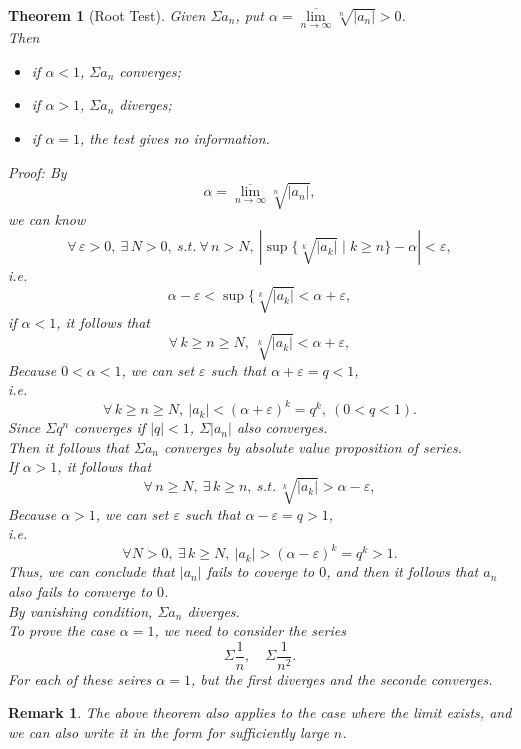 \documentclass[12pt]{article}
\theoremstyle{oneline}
\newtheorem{theorem}{Theorem}[subsection]
\newtheorem{remark}{Remark}[subsection]
\theoremstyle{twoline}
\begin{document}
\begin{theorem}[Root Test]
  Given $\Sigma a_n$, put $\alpha=\overline{\lim\limits_{n\to\infty}}\sqrt[n]{|a_n|}>0$.\\
  Then 
  \begin{itemize}
    \item if $\alpha<1$, $\Sigma a_n$ converges;
    \item if $\alpha >1$, $\Sigma a_n$ diverges;
    \item if $\alpha=1$, the test gives no information.
  \end{itemize}
  \textit{Proof:} By
  \[\alpha=\overline{\lim\limits_{n\to\infty}}\sqrt[n]{|a_n|},\]
  we can know
  \[
    \forall\, \varepsilon>0,~\exists\,N>0,~s.t.~\forall\,n>N,~|\sup \{\sqrt[k]{|a_k|}\mid k\geq n\}-\alpha|<\varepsilon,
  \]
  i.e.
  \[\alpha-\varepsilon<\sup \{\sqrt[k]{|a_k|}<\alpha+\varepsilon,\]
  if $\alpha<1$, it follows that
  \[\forall\,k\geq n\geq N,~ \sqrt[k]{|a_k|}<\alpha+\varepsilon,\]
  Because $0<\alpha<1$, we can set $\varepsilon$ such that $\alpha+\varepsilon=q<1$,\\
  i.e. \[\forall\,k\geq n\geq N,~ |a_k|<(\alpha+\varepsilon)^k=q^k,~(0<q<1).\]
  Since $\Sigma q^n$ converges if $|q|<1$, $\Sigma |a_n|$ also converges.\\
  Then it follows that $\Sigma a_n$ converges by absolute value proposition of series.\\
  If $\alpha>1$, it follows that
  \[\forall\,n\geq N,~\exists\,k\geq n,~s.t.~ \sqrt[k]{|a_k|}>\alpha-\varepsilon,\]
  Because $\alpha>1$, we can set $\varepsilon$ such that $\alpha-\varepsilon=q>1$,\\
  i.e. \[\forall N>0,~\exists\,k\geq N,~ |a_k|>(\alpha-\varepsilon)^k=q^k>1.\]
  Thus, we can conclude that $|a_n|$ fails to coverge to $0$, and then it follows that $a_n$ also fails to converge to $0$.\\
  By vanishing condition, $\Sigma a_n$ diverges.\\
  To prove the case $\alpha=1$, we need to consider the series
  \[\Sigma\frac1n,\quad\Sigma\frac1{n^2}.\]
  For each of these seires $\alpha=1$, but the first diverges and the seconde converges.
\end{theorem}
  
\begin{remark}
  The above theorem also applies to the case where the limit exists, and we can also write it in the form for sufficiently large $n$.
\end{remark}
\end{document}
